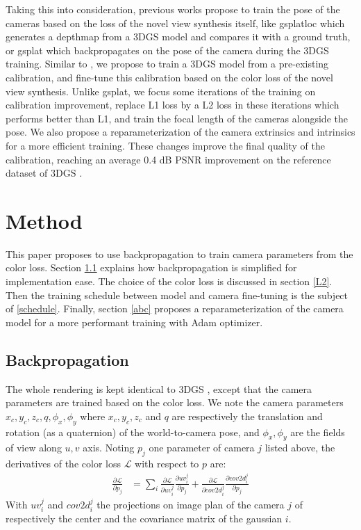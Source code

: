 \documentclass[a4paper,twoside,french]{article}
\begin{document}
Taking this into consideration, previous works propose to train the pose of the cameras based on the loss of the novel view synthesis itself, like 
gsplatloc \cite{zeller2024gsplatloc} which generates a depthmap from a 3DGS model and compares it with a ground truth, or gsplat \cite{ye2024gsplat}
which backpropagates on the pose of the camera during the 3DGS training. Similar to \cite{ye2024gsplat}, we propose to train a 3DGS model from
a pre-existing calibration, and fine-tune this calibration based on the color loss of the novel view synthesis. Unlike gsplat,
we focus some iterations of the training on calibration improvement, replace L1 loss by a L2 loss in these iterations which performs better than L1,
and train the focal length of the cameras alongside the pose. We also propose a reparameterization of the camera extrinsics and intrinsics
for a more efficient training. These changes improve the final quality of the calibration, reaching an average 0.4 dB PSNR improvement
on the reference dataset of 3DGS \cite{kerbl20233d}.

\section{Method} \label{method}

This paper proposes to use backpropagation to train camera parameters from the color loss.
Section \ref{backprop} explains how backpropagation is simplified for implementation ease.
The choice of the color loss is discussed in section \ref{L2}.
Then the training schedule between model and camera fine-tuning is the subject of \ref{schedule}.
Finally, section \ref{abc} proposes a reparameterization of the camera model for a more performant training with Adam optimizer.

\subsection{Backpropagation} \label{backprop}
The whole rendering is kept identical to 3DGS \cite{kerbl20233d}, except that the camera parameters are trained based on the color loss.
We note the camera parameters $x_c,y_c,z_c,q,\phi_x,\phi_y$ where $x_c,y_c,z_c$ and $q$ are respectively the translation and rotation (as a quaternion) of the
world-to-camera pose, and $\phi_x,\phi_y$ are the fields of view along $u,v$ axis.
Noting $p_j$ one parameter of camera $j$ listed above, the derivatives of the color loss $\mathcal{L}$ with respect to $p$ are:
\begin{align}
	\label{eq:1}
	\frac{\partial \mathcal{L}}{\partial p_j} &= \sum_{i} \frac{\partial \mathcal{L}}{\partial uv_i^j} \frac{\partial uv_i^j}{\partial p_j} + \frac{\partial \mathcal{L}}{\partial cov2d_i^j} \frac{\partial cov2d_i^j}{\partial p_j}
\end{align}
With $uv_i^j$ and $cov2d_i^j$ the projections on image plan of the camera $j$ of respectively the center and the covariance matrix of the gaussian $i$.
\end{document}
